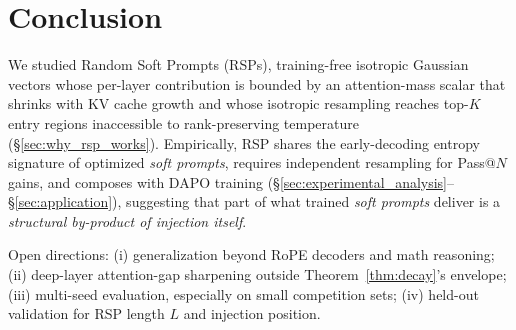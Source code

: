 
\section{Conclusion}\label{sec:conclusion}
\enlargethispage*{2\baselineskip}

We studied Random Soft Prompts (RSPs), training-free isotropic Gaussian vectors whose per-layer contribution is bounded by an attention-mass scalar that shrinks with KV cache growth and whose isotropic resampling reaches top-$K$ entry regions inaccessible to rank-preserving temperature (\S\ref{sec:why_rsp_works}). Empirically, RSP shares the early-decoding entropy signature of optimized \textit{soft prompts}, requires independent resampling for Pass@$N$ gains, and composes with DAPO training (\S\ref{sec:experimental_analysis}--\S\ref{sec:application}), suggesting that part of what trained \textit{soft prompts} deliver is a \emph{structural by-product of injection itself}.

Open directions: (i) generalization beyond RoPE decoders and math reasoning; (ii) deep-layer attention-gap sharpening outside Theorem~\ref{thm:decay}'s envelope; (iii) multi-seed evaluation, especially on small competition sets; (iv) held-out validation for RSP length $L$ and injection position.
